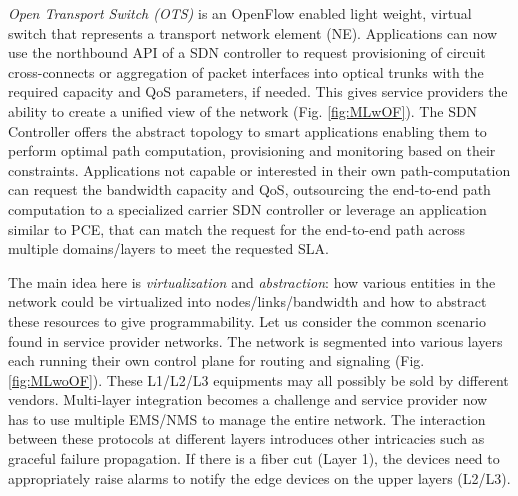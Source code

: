 \documentclass{sig-alternate-2013}
\begin{document}
	\textit{Open Transport Switch (OTS)} is an OpenFlow \cite{OF1.0} enabled light weight, virtual switch
	that represents a transport network element (NE).  Applications can now use the northbound API of a SDN controller to request
	provisioning of circuit cross-connects or aggregation of packet interfaces into optical trunks with the required
	capacity and QoS parameters, if needed. This gives service providers the ability to create a unified view  of the
	network (Fig. \ref{fig:MLwOF}).		
	The SDN Controller offers the abstract topology to smart applications enabling them to perform optimal path computation,
	provisioning and monitoring based on their constraints. Applications not capable or interested in their own path-computation can request the
	bandwidth capacity and QoS, outsourcing the end-to-end path computation to a specialized carrier SDN controller or leverage an application similar to PCE, 
	that can match the request for the end-to-end path across 	multiple domains/layers to meet the requested SLA. 

\iffalse
	The main idea here is \emph{virtualization} and \emph{abstraction}: how various entities in the network could 
	be virtualized into nodes/links/bandwidth and how to abstract these resources to give programmability.
	Let us consider the common scenario found in service provider networks. The network is segmented into
	various layers each running their own control plane for routing and signaling (Fig. \ref{fig:MLwoOF}).
	These L1/L2/L3 equipments may all possibly be sold by different vendors. Multi-layer integration becomes
	a challenge and service provider now has to use multiple EMS/NMS to manage the entire network. The
	interaction between these protocols at different layers introduces other intricacies such as graceful
	failure propagation. If there is a fiber cut (Layer 1), the devices need to appropriately raise alarms to
	notify the edge devices on the upper layers (L2/L3). \\
\end{document}
